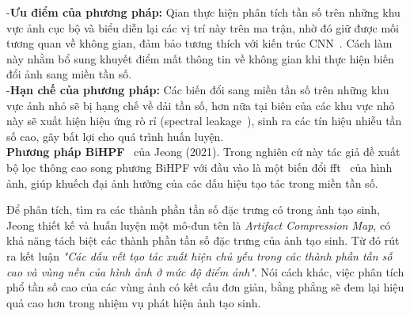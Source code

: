 %
%
-\textbf{Ưu điểm của phương pháp:}
%
Qian thực hiện phân tích tần số trên những khu vực ảnh cục bộ và biểu diễn lại các vị trí này trên ma trận, nhờ đó giữ được mối tương quan về không gian, đảm bảo tương thích với kiến trúc CNN~\cite{Krizhevsky2012ImageNetCW}. Cách làm này nhằm bổ sung khuyết điểm mất thông tin về không gian khi thực hiện biến đổi ảnh sang miền tần số.\\
%
%
-\textbf{Hạn chế của phương pháp:}
%
Các biến đổi sang miền tần số trên những khu vực ảnh nhỏ sẽ bị hạng chế về dải tần số, hơn nữa tại biên của các khu vực nhỏ này sẽ xuất hiện hiệu ứng rò rỉ (spectral leakage~\cite{ni_spectral_leakage}), sinh ra các tín hiệu nhiễu tần số cao, gây bất lợi cho quá trình huấn luyện.\\
%
%
\textbf{Phương pháp BiHPF}~\cite{Jeong2021BiHPFBH} của Jeong (2021).
%
Trong nghiên cứ này tác giả đề xuất bộ lọc thông cao song phương BiHPF với đầu vào là một biến đổi \gls{fft}~\cite{Arunachalam2013TheFF} của hình ảnh, giúp khuếch đại ảnh hưởng của các dấu hiệu tạo tác trong miền tần số.

Để phân tích, tìm ra các thành phần tần số đặc trưng có trong ảnh tạo sinh, Jeong thiết kế và huấn luyện một mô-đun tên là \textit{Artifact Compression Map}, có khả năng tách biệt các thành phần tần số đặc trưng của ảnh tạo sinh. Từ đó rút ra kết luận \textit{"Các dấu vết tạo tác xuất hiện chủ yếu trong các thành phần tần số cao và vùng nền của hình ảnh ở mức độ điểm ảnh"}. Nói cách khác, việc phân tích phổ tần số cao của các vùng ảnh có kết cấu đơn giản, bằng phẳng sẽ đem lại hiệu quả cao hơn trong nhiệm vụ phát hiện ảnh tạo sinh.

